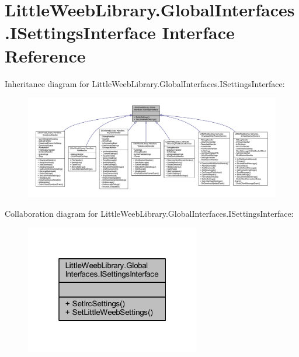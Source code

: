 \hypertarget{interface_little_weeb_library_1_1_global_interfaces_1_1_i_settings_interface}{}\section{Little\+Weeb\+Library.\+Global\+Interfaces.\+I\+Settings\+Interface Interface Reference}
\label{interface_little_weeb_library_1_1_global_interfaces_1_1_i_settings_interface}


Inheritance diagram for Little\+Weeb\+Library.\+Global\+Interfaces.\+I\+Settings\+Interface\+:\nopagebreak
\begin{figure}[H]
\begin{center}
\leavevmode
\includegraphics[width=350pt]{interface_little_weeb_library_1_1_global_interfaces_1_1_i_settings_interface__inherit__graph}
\end{center}
\end{figure}


Collaboration diagram for Little\+Weeb\+Library.\+Global\+Interfaces.\+I\+Settings\+Interface\+:\nopagebreak
\begin{figure}[H]
\begin{center}
\leavevmode
\includegraphics[width=217pt]{interface_little_weeb_library_1_1_global_interfaces_1_1_i_settings_interface__coll__graph}
\end{center}
\end{figure}
